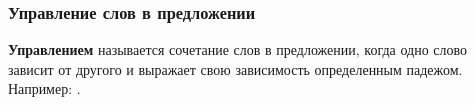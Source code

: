 \documentclass[11pt,a4paper,oneside]{memoir}
\begin{document}
    \bigskip{}

                \subsubsection{Управление слов в предложении}

    \textbf{Управлением} называется сочетание слов в предложении, когда одно слово зависит от другого и выражает свою зависимость определенным падежом. Например: {}.

\end{document}
